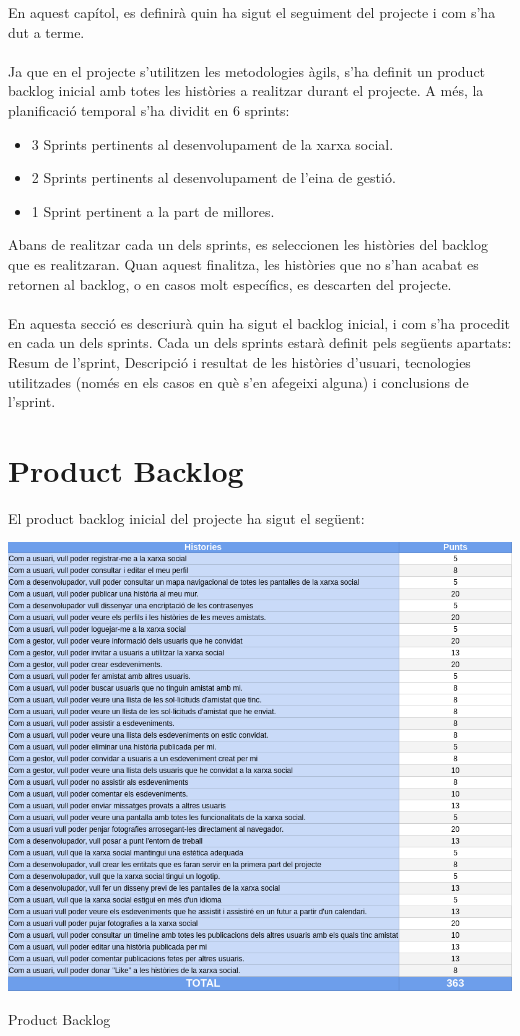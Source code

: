 \documentclass[11pt,catalan,listoffigures,listoftables]{tfgetsinf}
\begin{document}
En aquest capítol, es definirà quin ha sigut el seguiment del projecte i com s'ha dut a terme. \\ \\
Ja que en el projecte s'utilitzen les metodologies àgils, s'ha definit un product backlog inicial amb totes les històries a realitzar durant el projecte. A més, la planificació temporal s'ha dividit en 6 sprints:
\begin{itemize}
\item 3 Sprints pertinents al desenvolupament de la xarxa social.
\item 2 Sprints pertinents al desenvolupament de l'eina de gestió.
\item 1 Sprint pertinent a la part de millores.
\end{itemize}
Abans de realitzar cada un dels sprints, es seleccionen les històries del backlog que es realitzaran. Quan aquest finalitza, les històries que no s'han acabat es retornen al backlog, o en casos molt específics, es descarten del projecte.\\ \\
En aquesta secció es descriurà quin ha sigut el backlog inicial, i com s'ha procedit en cada un dels sprints. Cada un dels sprints estarà definit pels següents apartats: Resum de l'sprint, Descripció i resultat de les històries d'usuari, tecnologies utilitzades (només en els casos en què s'en afegeixi alguna) i conclusions de l'sprint.
\newpage
\section{Product Backlog}

El product backlog inicial del projecte ha sigut el següent:

\begin{table}[H]
\centering
\includegraphics[width=15cm]{images/taula8}
\caption[Taula 7.5]{Product Backlog}
\centering
\end{table}
\end{document}
